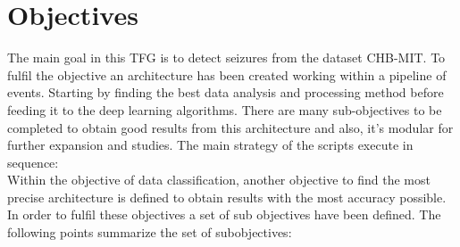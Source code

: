 \section{Objectives}
\label{sec-objectives}
The main goal in this TFG is to detect seizures from the dataset CHB-MIT. To fulfil the objective an architecture has been created working within a pipeline of events. Starting by finding the best data analysis and processing method before feeding it to the deep learning algorithms. There are many sub-objectives to be completed to obtain good results from this architecture and also, it’s modular for further expansion and studies. The main strategy of the scripts execute in sequence:
\\

Within the objective of data classification, another objective to find the most precise architecture is defined to obtain results with the most accuracy possible. In order to fulfil these objectives a set of sub objectives have been defined. The following points summarize the set of subobjectives:
\\
